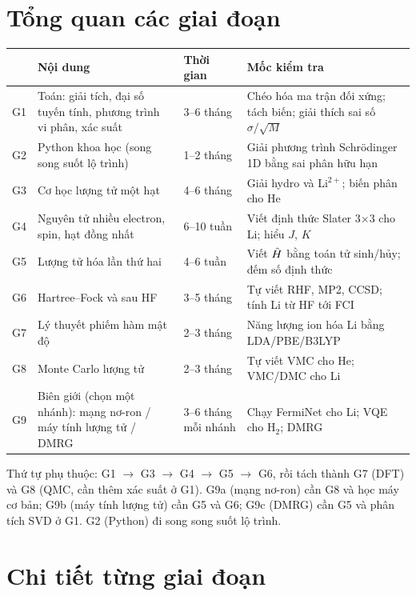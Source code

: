 \section*{Tổng quan các giai đoạn}
\begin{center}
\small
\begin{tabularx}{\textwidth}{@{}l>{\raggedright\arraybackslash}p{3.3cm}l>{\raggedright\arraybackslash}X@{}}
\toprule
& Nội dung & Thời gian & Mốc kiểm tra \\
\midrule
G1 & Toán: giải tích, đại số tuyến tính, phương trình vi phân, xác suất & 3--6 tháng & Chéo hóa ma trận đối xứng; tách biến; giải thích sai số $\sigma/\sqrt M$ \\
G2 & Python khoa học (song song suốt lộ trình) & 1--2 tháng & Giải phương trình Schrödinger 1D bằng sai phân hữu hạn \\
G3 & Cơ học lượng tử một hạt & 4--6 tháng & Giải hydro và Li$^{2+}$; biến phân cho He \\
G4 & Nguyên tử nhiều electron, spin, hạt đồng nhất & 6--10 tuần & Viết định thức Slater 3$\times$3 cho Li; hiểu $J$, $K$ \\
G5 & Lượng tử hóa lần thứ hai & 4--6 tuần & Viết $\hat H$ bằng toán tử sinh/hủy; đếm số định thức \\
G6 & Hartree--Fock và sau HF & 3--5 tháng & Tự viết RHF, MP2, CCSD; tính Li từ HF tới FCI \\
G7 & Lý thuyết phiếm hàm mật độ & 2--3 tháng & Năng lượng ion hóa Li bằng LDA/PBE/B3LYP \\
G8 & Monte Carlo lượng tử & 2--3 tháng & Tự viết VMC cho He; VMC/DMC cho Li \\
G9 & Biên giới (chọn một nhánh): mạng nơ-ron / máy tính lượng tử / DMRG & 3--6 tháng mỗi nhánh & Chạy FermiNet cho Li; VQE cho H$_2$; DMRG \\
\bottomrule
\end{tabularx}
\end{center}

Thứ tự phụ thuộc: G1 $\to$ G3 $\to$ G4 $\to$ G5 $\to$ G6, rồi tách thành G7 (DFT) và G8 (QMC, cần thêm xác suất ở G1). G9a (mạng nơ-ron) cần G8 và học máy cơ bản; G9b (máy tính lượng tử) cần G5 và G6; G9c (DMRG) cần G5 và phân tích SVD ở G1. G2 (Python) đi song song suốt lộ trình.

\section*{Chi tiết từng giai đoạn}

